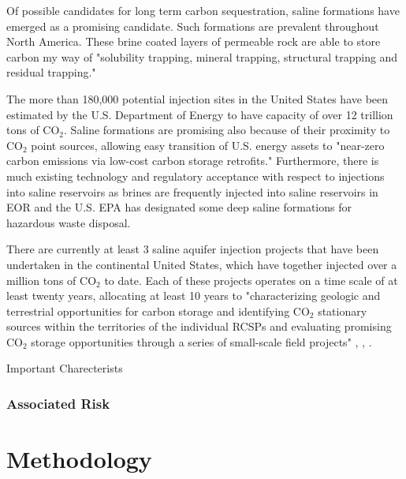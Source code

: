 \documentclass[letterpaper, 12pt]{article}
\begin{document}
\par Of possible candidates for long term carbon sequestration, saline formations have emerged as a promising candidate. Such formations are prevalent throughout North America. These brine coated layers of permeable rock are able to store carbon my way of "solubility trapping, mineral trapping, structural trapping and residual trapping."

The more than 180,000 potential injection sites in the United States have been estimated by the U.S. Department of Energy to have capacity of over 12 trillion tons of CO$_2$. Saline formations are promising also because of their proximity to CO$_2$ point sources, allowing easy transition of U.S. energy assets to "near-zero carbon emissions via low-cost carbon storage retrofits." \cite{whysaline} Furthermore, there is much existing technology and regulatory acceptance with respect to injections into saline reservoirs as brines are frequently injected into saline reservoirs in EOR and the U.S. EPA has designated some deep saline formations for hazardous waste disposal.

\par There are currently at least 3 saline aquifer injection projects that have been undertaken in the continental United States, which have together injected over a million tons of CO$_2$ to date. Each of these projects operates on a time scale of at least twenty years, allocating at least 10 years to "characterizing geologic and terrestrial opportunities for carbon storage and identifying CO$_2$ stationary sources within the territories of the individual RCSPs and evaluating promising CO$_2$ storage opportunities through a series of small-scale field projects"  \cite{midwestinject}, \cite{midwestinject2}, \cite{southeastinject}. 

Important Charecterists 



\subsubsection{Associated Risk} 


\section{Methodology}
\end{document}
